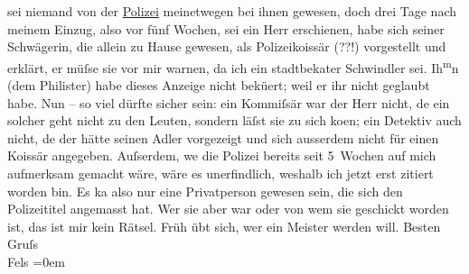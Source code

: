 \begin{ledgroupsized}[t]{13cm}
               sei niemand von der \uline{Polizei} meinetwegen bei ihnen
               gewesen, doch drei Tage nach meinem Einzug, also vor fünf Wochen, sei ein Herr
               erschienen, habe sich seiner Schwägerin, die allein zu Hause gewesen, als Polizeiko{\geminationm}issär (??!) vorgestellt und erklärt, er müſse sie vor
               mir warnen, da ich ein stadtbeka{\geminationn}ter Schwindler sei. Ih\substVorne{}\textsuperscript{m}\substDazwischen{}n\substHinten{} (dem Philister)
               habe dieses Anzeige nicht bekü{\geminationm}ert; weil er ihr nicht
               geglaubt habe.\pend
           \pstart
           Nun – so viel dürfte sicher sein: ein Kommiſsär war der Herr nicht, de{\geminationn} ein solcher geht nicht zu den Leuten, sondern läſst
               sie zu sich ko{\geminationm}en; ein Detektiv auch nicht, de{\geminationn} der {\pb}hätte seinen Adler
               vorgezeigt und sich ausserdem nicht für einen Ko{\geminationm}issär
               angegeben. Auſserdem, we{\geminationn} die Polizei bereits seit
               5 Wochen auf mich aufmerksam gemacht wäre, wäre es unerfindlich, weshalb ich jetzt
               erst zitiert worden bin. Es ka{\geminationn} also nur eine
               Privatperson gewesen sein, die sich den Polizeititel angemasst hat. Wer sie aber war
               oder von wem sie geschickt worden ist, das ist mir kein Rätsel. Früh übt sich, wer
               ein Meister werden will.\pend
           \pstart
           Besten Gruſs{\\[\baselineskip]}\spacefill\mbox{Fels}\pend
           \leftskip=0em{}
         
         \endnumbering{}\end{ledgroupsized}  \newcommand{\dateiname}{L00401}\newcommand{\titel}{Friedrich M. Fels an Arthur Schnitzler, [12. 11. 1894]}\newcommand{\editorInnen}{Martin Anton Müller und Gerd-Hermann Susen}
      